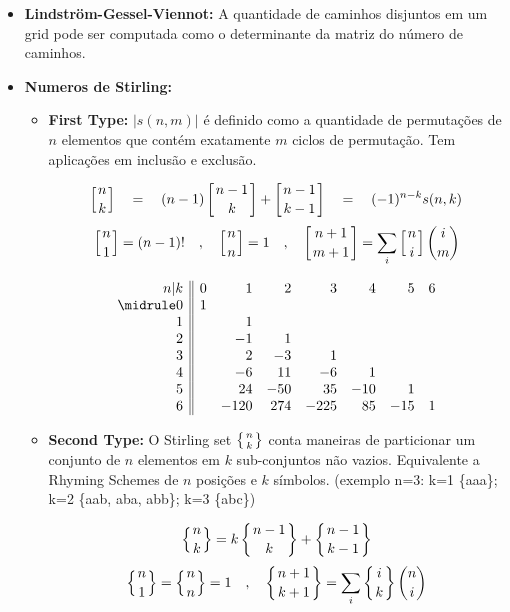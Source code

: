 \begin{small}
\begin{itemize}
\item\textbf{Lindström-Gessel-Viennot:} A quantidade de caminhos disjuntos em um grid pode ser computada como o determinante da matriz do número de caminhos.


    \item \textbf{Numeros de Stirling:}
    \begin{itemize}
        \item \textbf{First Type:} 
         $|s(n,m)|$ é definido como a quantidade de permutações de $n$ elementos que contém exatamente $m$ ciclos de permutação. Tem aplicações em inclusão e exclusão.
        
        \[
        \left[{n \atop k}\right]  \quad=\quad 
        (n-1) \left[{ n-1 \atop k }\right] + \left[{n-1 \atop k-1}\right] 
        \quad=\quad (-1)^{n-k}s(n,k)
        \]
        \[
        \left[{n \atop 1}\right] = (n-1)! \quad , \quad
        \left[{n \atop n}\right] = 1 \quad , \quad
        \left[{n+1 \atop m+1}\right] = \sum_{i} \left[{n \atop i}\right] \binom{i}{m}
        \]
        
        \[\begin{array}{r||rrrrrrr}
        n|k & 0 & 1 & 2 & 3 & 4 & 5 & 6   \\\midrule
        0 & 1 &      &     &     &     &     &   \\
        1 &   & 1    &     &     &     &     &   \\
        2 &   & -1   & 1   &     &     &     &   \\
        3 &   & 2    & -3  & 1   &     &     &   \\
        4 &   & -6   & 11  & -6  & 1   &     &   \\
        5 &   & 24   & -50 & 35  & -10 & 1   &   \\
        6 &   & -120 & 274 & -225& 85  & -15 & 1 \\
        \end{array}\]
        
        
        \item \textbf{Second Type:} O Stirling set 
        ${\left\{{n \atop k}\right\}}$ conta maneiras de  particionar um conjunto de $n$ elementos em $k$ sub-conjuntos não vazios. 
        Equivalente a Rhyming Schemes de $n$ posições e $k$ símbolos. (exemplo n=3: k=1 \{aaa\}; k=2 \{aab, aba, abb\}; k=3 \{abc\})
        
        \[
        \left\{{n \atop k}\right\}  =
        k \left\{{n-1 \atop k}\right\} + \left\{{n-1 \atop k-1}\right\}
        \]
        \[
        \left\{{n \atop 1}\right\} = \left\{{n \atop n}\right\} = 1 \quad , \quad
        \left\{{n+1 \atop k+1}\right\} = \sum_{i} \left\{{i \atop k}\right\} \binom{n}{i}
        \]
        

\end{itemize}
\end{itemize}
\end{small}
